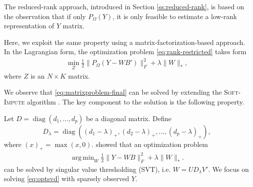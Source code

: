 \documentclass[preprint]{imsart}
\numberwithin{equation}{section}
\theoremstyle{plain}
\DeclareMathOperator*{\argmin}{arg\,min}
\DeclareMathOperator*{\diag}{diag}
\begin{document}
The reduced-rank approach, introduced in Section \ref{ss:reduced-rank}, is based on the observation that if only $P_\Omega(Y)$, it is only feasible to estimate a low-rank representation of $Y$ matrix. 

Here, we exploit the same property using a matrix-factorization-based approach. In the Lagrangian form, the optimization problem \eqref{eq:rank-restricted} takes form
\begin{align}\label{eq:matrixproblem-final}
\min_Z \frac{1}{2} \|P_\Omega(Y - WB')\|_F^2 + \lambda\|W\|_*,
\end{align}
where $Z$ is an $N \times K$ matrix. %

We observe that \eqref{eq:matrixproblem-final} can be solved by extending the \textsc{Soft-Impute} algorithm \citep{mazumder2010spectral}. The key component to the solution is the following property.

Let $D = \diag(d_1,...,d_p)$ be a diagonal matrix. Define 
\begin{equation}
D_\lambda = \diag((d_1 - \lambda)_+,(d_2 - \lambda)_+,...,(d_p - \lambda)_+),\label{eq:thresholding}
\end{equation}
where $(x)_+ = \max(x, 0)$. \citet{cai2010singular} showed that an optimization problem
\begin{align}\label{eq:optsvd}
\argmin_{W} \frac{1}{2} \| Y - WB \|_F^2 + \lambda\|W\|_*.
\end{align}
can be solved by singular value thresholding (SVT), i.e. $W = UD_\lambda V'$. We focus on solving \eqref{eq:optsvd} with sparsely observed  $Y$. %
\end{document}
